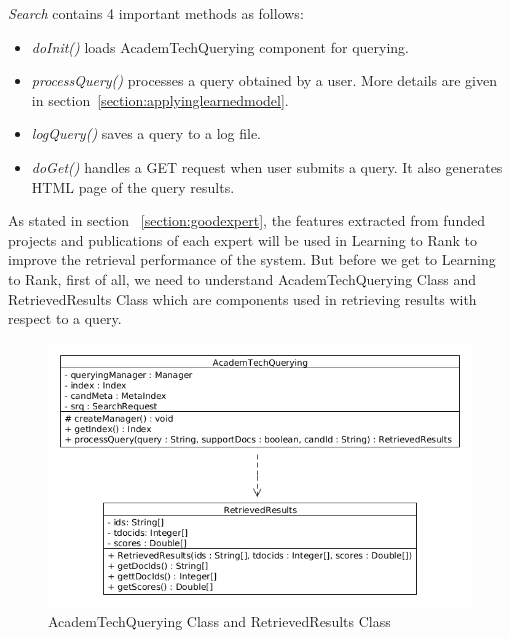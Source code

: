 \textit{Search} contains 4 important methods as follows: 
\begin{itemize}
 \item \textit{doInit()} loads AcademTechQuerying component for querying.
 \item \textit{processQuery()} processes a query obtained by a user. More details are given in section~\ref{section:applyinglearnedmodel}.
 \item \textit{logQuery()} saves a query to a log file.
 \item \textit{doGet()} handles a GET request when user submits a query. It also generates HTML page of the query results.
\end{itemize}

As stated in section ~\ref{section:goodexpert}, the features extracted from funded projects and publications of each expert will be used in Learning to Rank
to improve the retrieval performance of the system. But before we get to Learning to Rank, first of all, we need to understand
AcademTechQuerying Class and RetrievedResults Class which are components used in retrieving results with respect to a query. 
\begin{figure}
\centering
\includegraphics[scale=0.3]{./figures/AcademTechQuerying.png}
\caption{AcademTechQuerying Class and RetrievedResults Class} \label{fig:AcademTechQuerying} 
\end{figure}


